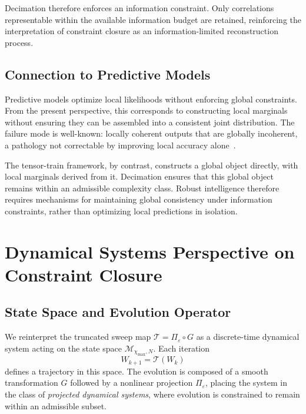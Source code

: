 \documentclass[11pt]{article}
\theoremstyle{definition}
\begin{document}
Decimation therefore enforces an information constraint. Only correlations
representable within the available information budget are retained, reinforcing
the interpretation of constraint closure as an information-limited
reconstruction process.

\subsection{Connection to Predictive Models}

Predictive models optimize local likelihoods without enforcing global
constraints. From the present perspective, this corresponds to constructing
local marginals without ensuring they can be assembled into a consistent joint
distribution. The failure mode is well-known: locally coherent outputs that are
globally incoherent, a pathology not correctable by improving local accuracy
alone~\cite{vaswani2017, lecun2015}.

The tensor-train framework, by contrast, constructs a global object directly,
with local marginals derived from it. Decimation ensures that this global
object remains within an admissible complexity class. Robust intelligence
therefore requires mechanisms for maintaining global consistency under
information constraints, rather than optimizing local predictions in isolation.

\section{Dynamical Systems Perspective on Constraint Closure}

\subsection{State Space and Evolution Operator}

We reinterpret the truncated sweep map $\mathcal{T} = \Pi_\varepsilon \circ G$
as a discrete-time dynamical system acting on the state space
$\mathcal{M}_{\chi_{\max},N}$. Each iteration
\begin{equation}
  W_{k+1} = \mathcal{T}(W_k)
\end{equation}
defines a trajectory in this space. The evolution is composed of a smooth
transformation $G$ followed by a nonlinear projection $\Pi_\varepsilon$, placing
the system in the class of \emph{projected dynamical systems}, where evolution
is constrained to remain within an admissible subset.
\end{document}

